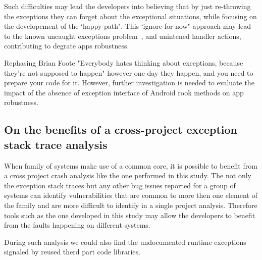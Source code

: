 \documentclass[conference]{IEEEtran}
\begin{document}
Such difficulties may lead the developers into believing that by just re-throwing the exceptions they can 
forget about the exceptional situations, while focusing on the developement of the `happy path". 
This `ignore-for-now" approach may lead to the known uncaught exceptions problem~\cite{jo2004uncaught},
and unintened handler actions,  contributing to degrate apps robustness.

Rephasing Brian Foote "Everybody hates thinking about exceptions, because they’re not supposed to happen"
however one day they happen, and you need to prepare your code for it. However, further investigation
 is needed to evaluate the impact of  the absence of exception interface of Android rook methods on
app robustness.

\subsection{On the benefits of a cross-project exception stack trace analysis}  

When family of systems make use of a common core, it is possible to benefit from a cross project crash analysis like the one performed in this study.
 The not only the exception stack traces but any other bug issues reported for a group of systems can identify vulnerabilities 
that are common to more then one element of the family and are more difficult to identify in a single project analysis.
Therefore tools such as the one developed in this study may allow the developers to 
benefit from the faults happening on different systems.  



During such analysis we could also find the undocumented runtime exceptions 
signaled by reused therd part code libraries. 
\end{document}
